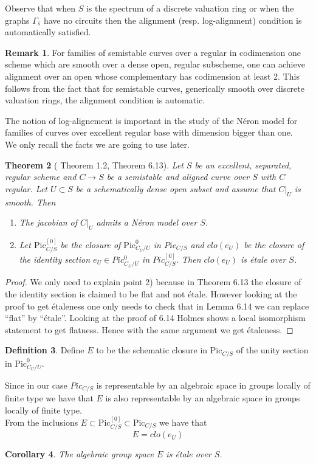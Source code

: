 \documentclass{amsart}
\newtheorem{thm}{Theorem}[section]
\newtheorem{cor}[thm]{Corollary}
\theoremstyle{definition}
\newtheorem{definition}[thm]{Definition}
\newtheorem{rmk}[thm]{Remark}
\numberwithin{equation}{section}
\begin{document}
Observe that when $S$ is the spectrum of a discrete valuation ring or when the graphs $\Gamma_{\bar{s}}$ have no circuits then the alignment (resp. log-alignment) condition is automatically satisfied.\\

\begin{rmk}\label{alignmentcod2}
For families of semistable curves over a regular in codimension one scheme which are smooth over a dense open, regular subscheme, one can achieve alignment over an open whose complementary has codimension at least 2.
This follows from the fact that for semistable curves, generically smooth over discrete valuation rings, the alignment condition is automatic.\\
\end{rmk}

The notion of log-alignement is important in the study of the N\'eron model for families of curves over excellent regular base with dimension bigger than one.\\
We only recall the facts we are going to use later.
\begin{thm}[\cite{hol} Theorem 1.2, Theorem 6.13]\label{hol:main}
Let $S$ be an excellent, separated, regular scheme and $C{\rightarrow} S$ be a semistable and aligned curve over $S$ with $C$ regular. Let $U\subset S$ be a schematically dense open subset and assume that $C|_U$ is smooth. Then
\begin{enumerate}
    \item The jacobian of $C|_U$ admits a N\'eron model over $S$.
    \item Let ${\mbox{Pic}}_{C/S}^{[0]}$ be the closure of ${\mbox{Pic}}_{C_U/U}^0$ in $Pic_{C/S}$ and $clo(e_U)$ be the closure of the identity section $e_U\in Pic_{C_U/U}^{0}$ in $Pic_{C/S}^{[0]}$. Then $clo(e_U)$ is \'etale over $S$.
\end{enumerate}
\end{thm}
\begin{proof}
We only need to explain point 2) because in \cite{hol} Theorem 6.13 the closure of the identity section is claimed to be flat and not \'etale. However looking at the proof to get \'etaleness one only needs to check that in Lemma 6.14 we can replace ``flat'' by ``\'etale''. Looking at the proof of 6.14 Holmes shows a local isomorphism statement to get flatness. Hence with the same argument we get \'etaleness.
\end{proof}
\begin{definition}
  Define $E$ to be the schematic closure in ${\mbox{Pic}}_{C/S}$ of the unity section in ${\mbox{Pic}}_{C_U/U}^{0}$.
\end{definition}
\noindent Since in our case $Pic_{C/S}$ is representable by an algebraic space in groups locally of finite type we have that $E$ is also representable by an algebraic space in groups locally of finite type.\\
From the inclusions $E\subset {\mbox{Pic}}_{C/S}^{[0]}\subset {\mbox{Pic}}_{C/S}$ we have that
$$
E=clo(e_U)
$$
\begin{cor}\label{Eetale}
The algebraic group space $E$ is \'etale over $S$.
\end{cor}
\end{document}
